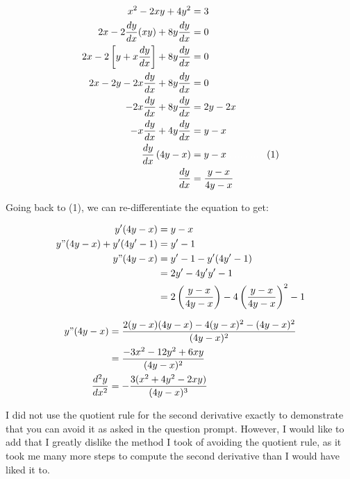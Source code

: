 \documentclass{article}
\begin{document}
    \begin{align*}
        x^2 - 2xy + 4y^2                            &= 3 \\
        2x - 2\frac{dy}{dx}(xy) + 8y\frac{dy}{dx}   &= 0 \\
        2x - 2\left[y + x\frac{dy}{dx}\right] + 8y \frac{dy}{dx}    &= 0 \\
        2x - 2y - 2x \frac{dy}{dx} + 8y \frac{dy}{dx}               &= 0 \\
        -2x\frac{dy}{dx} + 8y \frac{dy}{dx}                         &= 2y - 2x \\
        -x\frac{dy}{dx} + 4y \frac{dy}{dx}                          &= y - x \\
        \frac{dy}{dx}\left(4y-x\right)                              &= y - x \text{\color{white}...............\color{black}(1)} \\
        \frac{dy}{dx}                                               &= \frac{y-x}{4y-x}
    \end{align*}

    Going back to (1), we can re-differentiate the equation to get:

    \begin{align*}
        y'(4y-x)                &= y - x \\
        y"(4y-x)+y'(4y'-1)      &= y' - 1 \\
        y"(4y-x)    &= y'-1-y'(4y'-1) \\
                    &= 2y' - 4y'y' - 1 \\
                    &= 2\left(\frac{y-x}{4y-x}\right) - 4\left(\frac{y-x}{4y-x}\right)^2 - 1
    \end{align*}

    \pagebreak
    \thispagestyle{page3}

    \begin{align*}
        y"(4y-x)                                &= \frac{2(y-x)(4y-x)-4(y-x)^2-(4y-x)^2}{(4y-x)^2} \\
                                                &= \frac{-3x^2 -12y^2 + 6xy}{(4y-x)^2} \\
        \frac{d^2 y}{dx^2}                      &= -\frac{3(x^2+4y^2-2xy)}{(4y-x)^3}
    \end{align*}

    I did not use the quotient rule for the second derivative exactly to demonstrate that you can avoid it as asked in the question prompt. However, I would like to add that I greatly dislike the method I took of
    avoiding the quotient rule, as it took me many more steps to compute the second derivative than I would have liked it to.
\end{document}
